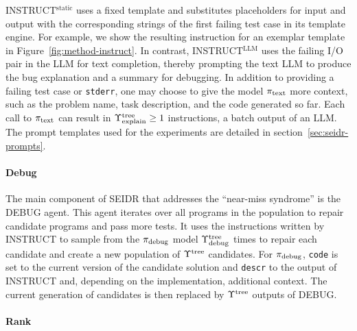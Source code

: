 INSTRUCT$^{\text{static}}$ uses a fixed template and substitutes placeholders for input and output with the corresponding strings of the first failing test case in its template engine.
For example, we show the resulting instruction for an exemplar template in Figure~\ref{fig:method-instruct}.
In contrast, INSTRUCT$^{\text{LLM}}$ uses the failing I/O pair in the LLM for text completion, thereby prompting the text LLM to produce the bug explanation and a summary for debugging. 
In addition to providing a failing test case or \texttt{stderr}, one may choose to give the model $ \pi_\text{text} $ more context, such as the problem name, task description, and the code generated so far. 
Each call to $ \pi_\text{text} $ can result in $\Upsilon^\text{tree}_\text{explain}\ge1$ instructions, a batch output of an LLM.
The prompt templates used for the experiments are detailed in section~\ref{sec:seidr-prompts}.


\paragraph{Debug}

The main component of SEIDR that addresses the ``near-miss syndrome'' is the DEBUG agent.  
This agent iterates over all programs in the population to repair candidate programs and pass more tests. 
It uses the instructions written by INSTRUCT to sample from the $ \pi_\text{debug} $ model $\Upsilon^\text{tree}_\text{debug}$ times
to repair each candidate and create a new population of $\Upsilon^\text{tree}{}$ candidates.
For $ \pi_\text{debug} $, \texttt{code} is set to the current version of the candidate solution and \texttt{descr} to the output of INSTRUCT and, depending on the implementation, additional context.
The current generation of candidates is then replaced by $\Upsilon^\text{tree}{}$ outputs of DEBUG.

\paragraph{Rank}

